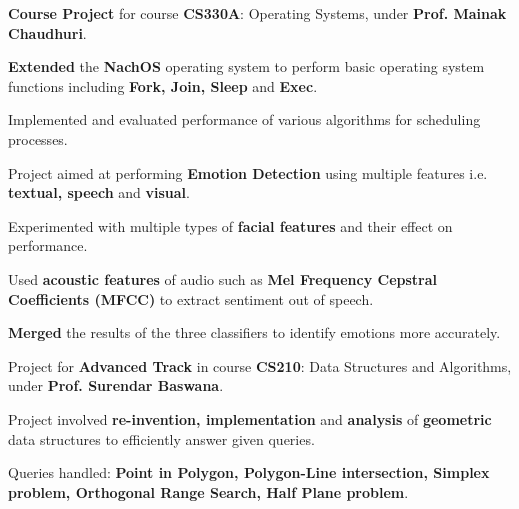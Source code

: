 \documentclass[a4paper]{norm-resume}
\begin{document}
	\vspace{2mm}

	   
	\begin{tightitemize}
	\small
	{
	\item \textbf{Course Project} for course \textbf{CS330A}: Operating Systems, under \textbf{Prof. Mainak Chaudhuri}.
	\item \textbf{Extended} the \textbf{NachOS} operating system to perform basic operating system functions including \textbf{Fork, Join, Sleep} and \textbf{Exec}. 
	\item Implemented and evaluated performance of various algorithms for scheduling processes.
	}
	\end{tightitemize}
		
	\vspace{2mm}
	
	   \descript{May '14 - Jun '14}
	\begin{tightitemize}
	\small
	{
	\item Project aimed at performing \textbf{Emotion Detection} using multiple features i.e. \textbf{textual, speech} and \textbf{visual}.
	\item Experimented with multiple types of \textbf{facial features} and their effect on performance.
	\item Used \textbf{acoustic features} of audio such as \textbf{Mel Frequency Cepstral Coefficients (MFCC)} to extract sentiment out of speech.
	\item \textbf{Merged} the results of the three classifiers to identify emotions more accurately.
	}
	\end{tightitemize}
		
	\vspace{2mm}
	
	   \descript{Sep '14 - Nov '14}
	\begin{tightitemize}
	\small
	{
	\item Project for \textbf{Advanced Track} in course \textbf{CS210}: Data Structures and Algorithms, under \textbf{Prof. Surendar Baswana}.
	\item Project involved \textbf{re-invention, implementation} and \textbf{analysis} of \textbf{geometric} data structures to efficiently answer given queries.
	\item Queries handled: \textbf{Point in Polygon, Polygon-Line intersection, Simplex problem, Orthogonal Range Search, Half Plane problem}.
	}
	\end{tightitemize}
 		
\end{document}
